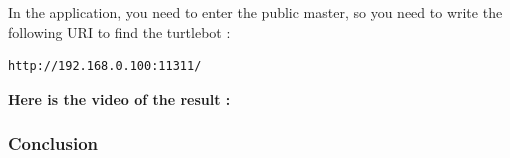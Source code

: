 \documentclass[10pt,a4paper]{article}
\begin{document}
In the application, you need to enter the public master, so you need to write the following URI to find the turtlebot : 
\begin{lstlisting}[frame=single]
http://192.168.0.100:11311/ 
\end{lstlisting}

\textbf{Here is the video of the result : }\\
 
\subsubsection{Conclusion}
\end{document}
